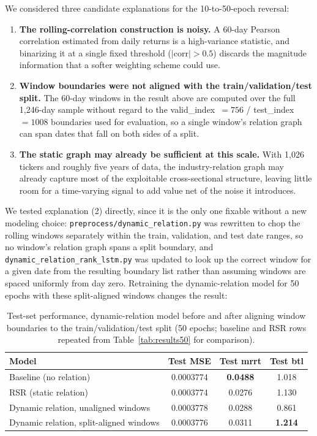 \documentclass[12pt]{article}
\begin{document}
We considered three candidate explanations for the 10-to-50-epoch reversal:

\begin{enumerate}
  \item \textbf{The rolling-correlation construction is noisy.} A 60-day Pearson correlation
  estimated from daily returns is a high-variance statistic, and binarizing it at a single fixed
  threshold ($|\text{corr}|>0.5$) discards the magnitude information that a softer weighting
  scheme could use.
  \item \textbf{Window boundaries were not aligned with the train/validation/test split.} The
  60-day windows in the result above are computed over the full 1{,}246-day sample without regard
  to the valid\_index~$=756$ / test\_index~$=1008$ boundaries used for evaluation, so a single
  window's relation graph can span dates that fall on both sides of a split.
  \item \textbf{The static graph may already be sufficient at this scale.} With 1{,}026 tickers
  and roughly five years of data, the industry-relation graph may already capture most of the
  exploitable cross-sectional structure, leaving little room for a time-varying signal to add
  value net of the noise it introduces.
\end{enumerate}

We tested explanation (2) directly, since it is the only one fixable without a new modeling
choice: \texttt{preprocess/dynamic\_relation.py} was rewritten to chop the rolling windows
separately within the train, validation, and test date ranges, so no window's relation graph spans
a split boundary, and \texttt{dynamic\_relation\_rank\_lstm.py} was updated to look up the correct
window for a given date from the resulting boundary list rather than assuming windows are spaced
uniformly from day zero. Retraining the dynamic-relation model for 50 epochs with these
split-aligned windows changes the result:

\begin{table}[h]
\centering
\caption{Test-set performance, dynamic-relation model before and after aligning window
boundaries to the train/validation/test split (50 epochs; baseline and RSR rows repeated from
Table~\ref{tab:results50} for comparison).}
\label{tab:results-aligned}
\begin{tabular}{lccc}
\toprule
Model & Test MSE & Test mrrt & Test btl \\
\midrule
Baseline (no relation) & 0.0003774 & \textbf{0.0488} & 1.018 \\
RSR (static relation) & 0.0003774 & 0.0276 & 1.130 \\
Dynamic relation, unaligned windows & 0.0003778 & 0.0288 & 0.861 \\
Dynamic relation, split-aligned windows & 0.0003776 & 0.0311 & \textbf{1.214} \\
\bottomrule
\end{tabular}
\end{table}
\end{document}
